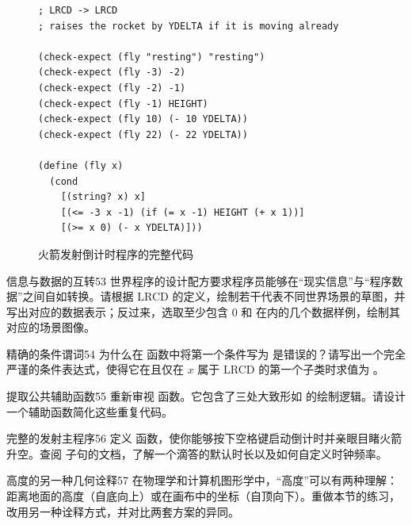 \begin{figure}[htbp]
  \centering
\begin{lstlisting}[language=BSL, basicstyle=\scriptsize\ttfamily]
; LRCD -> LRCD
; raises the rocket by YDELTA if it is moving already

(check-expect (fly "resting") "resting")
(check-expect (fly -3) -2)
(check-expect (fly -2) -1)
(check-expect (fly -1) HEIGHT)
(check-expect (fly 10) (- 10 YDELTA))
(check-expect (fly 22) (- 22 YDELTA))

(define (fly x)
  (cond
    [(string? x) x]
    [(<= -3 x -1) (if (= x -1) HEIGHT (+ x 1))]
    [(>= x 0) (- x YDELTA)]))
\end{lstlisting}
  \caption{火箭发射倒计时程序的完整代码}
  \label{fig:ch04_rocket_full}
\end{figure}

\begin{exercise}{信息与数据的互转}{53}
世界程序的设计配方要求程序员能够在“现实信息”与“程序数据”之间自如转换。请根据 LRCD 的定义，绘制若干代表不同世界场景的草图，并写出对应的数据表示；反过来，选取至少包含 $0$ 和  在内的几个数据样例，绘制其对应的场景图像。
\end{exercise}

\begin{exercise}{精确的条件谓词}{54}
为什么在  函数中将第一个条件写为  是错误的？请写出一个完全严谨的条件表达式，使得它在且仅在 $x$ 属于 LRCD 的第一个子类时求值为 。
\end{exercise}

\begin{exercise}{提取公共辅助函数}{55}
重新审视  函数。它包含了三处大致形如  的绘制逻辑。请设计一个辅助函数简化这些重复代码。
\end{exercise}

\begin{exercise}{完整的发射主程序}{56}
定义  函数，使你能够按下空格键启动倒计时并亲眼目睹火箭升空。查阅  子句的文档，了解一个滴答的默认时长以及如何自定义时钟频率。
\end{exercise}

\begin{exercise}{高度的另一种几何诠释}{57}
在物理学和计算机图形学中，“高度”可以有两种理解：距离地面的高度（自底向上）或在画布中的坐标（自顶向下）。重做本节的练习，改用另一种诠释方式，并对比两套方案的异同。
\end{exercise}

